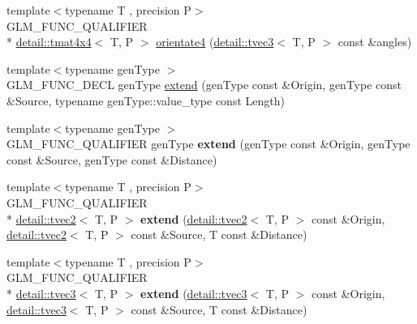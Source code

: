 \begin{DoxyCompactItemize}
{\footnotesize template$<$typename T , precision P$>$ }\\G\-L\-M\-\_\-\-F\-U\-N\-C\-\_\-\-Q\-U\-A\-L\-I\-F\-I\-E\-R \\*
\hyperlink{structglm_1_1detail_1_1tmat4x4}{detail\-::tmat4x4}$<$ T, P $>$ \hyperlink{group__gtx__euler__angles_ga3b9f62da9726cdad708df41712792082}{orientate4} (\hyperlink{structglm_1_1detail_1_1tvec3}{detail\-::tvec3}$<$ T, P $>$ const \&angles)
\item 
{\footnotesize template$<$typename gen\-Type $>$ }\\G\-L\-M\-\_\-\-F\-U\-N\-C\-\_\-\-D\-E\-C\-L gen\-Type \hyperlink{group__gtx__extend_ga8140caae613b0f847ab0d7175dc03a37}{extend} (gen\-Type const \&Origin, gen\-Type const \&Source, typename gen\-Type\-::value\-\_\-type const Length)
\item 
\hypertarget{namespaceglm_a88c4890406fab3280de470ce780e6b9d}{{\footnotesize template$<$typename gen\-Type $>$ }\\G\-L\-M\-\_\-\-F\-U\-N\-C\-\_\-\-Q\-U\-A\-L\-I\-F\-I\-E\-R gen\-Type {\bfseries extend} (gen\-Type const \&Origin, gen\-Type const \&Source, gen\-Type const \&Distance)}\label{namespaceglm_a88c4890406fab3280de470ce780e6b9d}

\item 
\hypertarget{namespaceglm_ac0149acd341de18dc0d0e96e02438d08}{{\footnotesize template$<$typename T , precision P$>$ }\\G\-L\-M\-\_\-\-F\-U\-N\-C\-\_\-\-Q\-U\-A\-L\-I\-F\-I\-E\-R \\*
\hyperlink{structglm_1_1detail_1_1tvec2}{detail\-::tvec2}$<$ T, P $>$ {\bfseries extend} (\hyperlink{structglm_1_1detail_1_1tvec2}{detail\-::tvec2}$<$ T, P $>$ const \&Origin, \hyperlink{structglm_1_1detail_1_1tvec2}{detail\-::tvec2}$<$ T, P $>$ const \&Source, T const \&Distance)}\label{namespaceglm_ac0149acd341de18dc0d0e96e02438d08}

\item 
\hypertarget{namespaceglm_ac6db537bc391ad6631e114ac3ce2fde8}{{\footnotesize template$<$typename T , precision P$>$ }\\G\-L\-M\-\_\-\-F\-U\-N\-C\-\_\-\-Q\-U\-A\-L\-I\-F\-I\-E\-R \\*
\hyperlink{structglm_1_1detail_1_1tvec3}{detail\-::tvec3}$<$ T, P $>$ {\bfseries extend} (\hyperlink{structglm_1_1detail_1_1tvec3}{detail\-::tvec3}$<$ T, P $>$ const \&Origin, \hyperlink{structglm_1_1detail_1_1tvec3}{detail\-::tvec3}$<$ T, P $>$ const \&Source, T const \&Distance)}\label{namespaceglm_ac6db537bc391ad6631e114ac3ce2fde8}


\end{DoxyCompactItemize}
